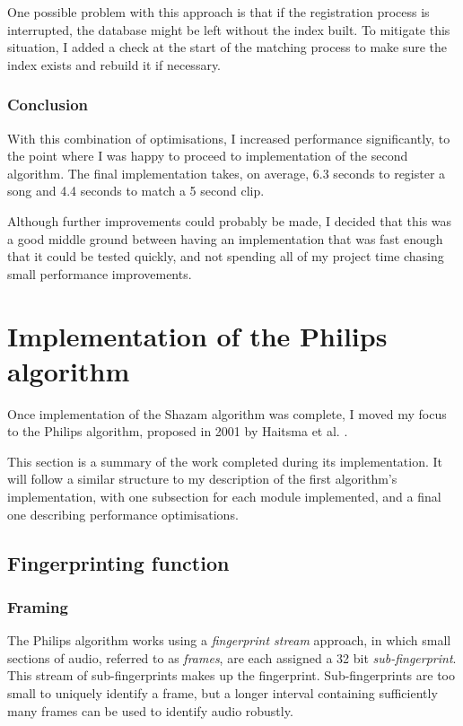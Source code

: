 \documentclass[12pt,a4paper,twoside,openright]{report}
\begin{document}
One possible problem with this approach is that if the registration process is interrupted, the database might be left without the index built. To mitigate this situation, I added a check at the start of the matching process to make sure the index exists and rebuild it if necessary.

\subsubsection{Conclusion}

With this combination of optimisations, I increased performance significantly, to the point where I was happy to proceed to implementation of the second algorithm. The final implementation takes, on average, 6.3 seconds to register a song and 4.4 seconds to match a 5 second clip.

Although further improvements could probably be made, I decided that this was a good middle ground between having an implementation that was fast enough that it could be tested quickly, and not spending all of my project time chasing small performance improvements.


\section{Implementation of the Philips algorithm}
\label{section:philips}

Once implementation of the Shazam algorithm was complete, I moved my focus to the Philips algorithm, proposed in 2001 by Haitsma et al. \cite{Haitsma02}. 

This section is a summary of the work completed during its implementation. It will follow a similar structure to my description of the first algorithm's implementation, with one subsection for each module implemented, and a final one describing performance optimisations.


\subsection{Fingerprinting function}
\label{philips:fingerprinter}

\subsubsection{Framing}

The Philips algorithm works using a \textit{fingerprint stream} approach, in which small sections of audio, referred to as \textit{frames}, are each assigned a 32 bit \textit{sub-fingerprint}. This stream of sub-fingerprints makes up the fingerprint. Sub-fingerprints are too small to uniquely identify a frame, but a longer interval containing sufficiently many frames can be used to identify audio robustly.
\end{document}
